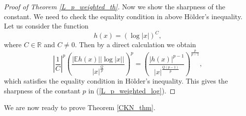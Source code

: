 \documentclass[a4paper,12pt,reqno]{amsart}
\renewcommand\eqref[1]{(\ref{#1})} %
\numberwithin{equation}{section}
\theoremstyle{plain}
\theoremstyle{definition}
\begin{document}
\begin{proof}[Proof of Theorem \ref{L_p_weighted_th}]
Now we show the sharpness of the constant. We need to check the equality
condition in above H\"older's inequality.
Let us consider the function
$$h(x)=(\log|x|)^{C},$$
where $C\in\mathbb{R}$ and $C\neq 0$.
Then by a direct calculation we obtain
\begin{equation}\label{Holder_eq2}
\left|\frac{1}{C}\right|^{p}\left(\frac{|\mathbb{E}h(x)||\log|x||}{|x|^{\frac{Q}{p}}}\right)^{p}=\left(\frac{|h(x)|^{p-1}}
{|x|^{\frac{Q (p-1)}{p}}}\right)^{\frac{p}{p-1}},
\end{equation}
which satisfies the equality condition in H\"older's inequality.
This gives the sharpness of the constant $p$ in \eqref{L_p_weighted_log}.
\end{proof}

We are now ready to prove Theorem \ref{CKN_thm}.
\end{document}

